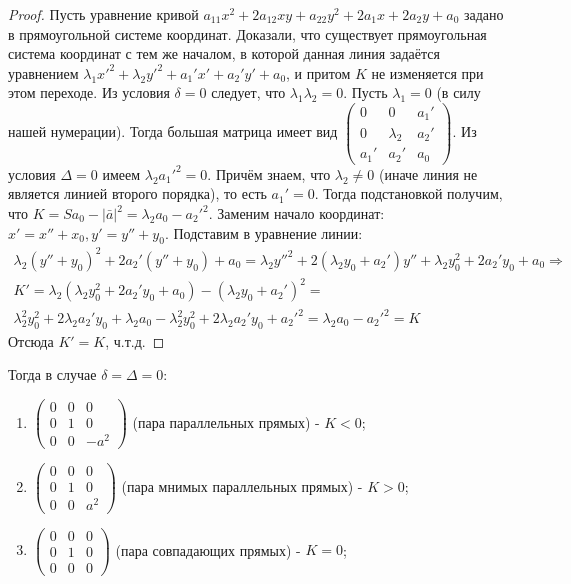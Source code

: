 \documentclass[a4paper, 12pt]{article}
\theoremstyle{definition}
\begin{document}
	\begin{proof}
		Пусть уравнение кривой $a_{11}x^2 + 2a_{12}xy + a_{22}y^2 + 2a_{1}x + 2a_{2}y + a_{0}$ задано в прямоугольной системе координат. Доказали, что существует прямоугольная система координат с тем же началом, в которой данная линия задаётся уравнением $\lambda_1{x'}^2 + \lambda_2{y'}^2 + a_{1}'x' + a_{2}'y' + a_{0}$, и притом $K$ не изменяется при этом переходе. Из условия $\delta = 0$ следует, что $\lambda_1\lambda_2 = 0$. Пусть $\lambda_1 = 0$ (в силу нашей нумерации). Тогда большая матрица имеет вид $\begin{pmatrix}0&0&a_{1}'\\0&\lambda_2&a_{2}'\\ a_{1}'&a_2'&a_{0}\end{pmatrix}$. Из условия $\Delta = 0$ имеем $\lambda_2{a_1'}^2 = 0$. Причём знаем, что $\lambda_2 \neq 0$ (иначе линия не является линией второго порядка), то есть $a_1' = 0$. Тогда подстановкой получим, что $K = Sa_0 - |\bar{a}|^2 = \lambda_2a_0 - {a_2'}^2$. Заменим начало координат: $x' = x'' + x_0, y' = y'' + y_0$. Подставим в уравнение линии: \begin{align*}\lambda_2(y'' + y_0)^2 + 2a_{2}'(y'' + y_0) + a_{0} = \lambda_2{y''}^2 + 2(\lambda_2y_0 +a_{2}')y'' + \lambda_2y_0^2 +2a_2'y_0 + a_{0} \Rightarrow \\K' = \lambda_2(\lambda_2y_0^2 +2a_2'y_0 + a_{0}) - (\lambda_2y_0 +a_{2}')^2 = \\\lambda_2^2y_0^2 +2\lambda_2a_2'y_0 + \lambda_2a_{0} - \lambda_2^2y_0^2 +2\lambda_2a_2'y_0 + {a_2'}^2 = \lambda_2a_0 - {a_2'}^2 = K
		\end{align*}
		Отсюда $K' = K$, ч.т.д.
	\end{proof}
	Тогда в случае $\delta = \Delta = 0$:
	\begin{enumerate}
		\item $\begin{pmatrix} 0&0&0 \\ 0&1&0 \\ 0&0&-a^2 \end{pmatrix}$ (пара параллельных прямых) - $K < 0$;
		\item $\begin{pmatrix} 0&0&0 \\ 0&1&0 \\ 0&0&a^2 \end{pmatrix}$ (пара мнимых параллельных прямых) - $K>0$;
		\item $\begin{pmatrix} 0&0&0 \\ 0&1&0 \\ 0&0&0 \end{pmatrix}$ (пара совпадающих прямых) - $K = 0$;
	\end{enumerate}
\end{document}
